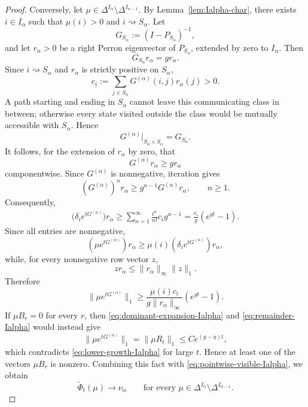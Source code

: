 \documentclass[10pt,letterpaper]{article}
\theoremstyle{compactplain}
\theoremstyle{compactdefinition}
\newcommand{\1}{\mathds{1}}
\begin{document}
\begin{proof}
Conversely, let
$\mu\in\Delta^{I_\alpha}\setminus\Delta^{I_{\alpha-1}}$. By
Lemma~\ref{lem:Ialpha-char}, there exists $i\in I_\alpha$ such that
$\mu(i)>0$ and $i\rightsquigarrow S_\alpha$. Let
\[
G_{S_\alpha}:=(I-P_{S_\alpha})^{-1},
\]
and let $r_\alpha>0$ be a right Perron eigenvector of $P_{S_\alpha}$,
extended by zero to $I_\alpha$. Then
\[
G_{S_\alpha}r_\alpha=gr_\alpha.
\]
Since $i\rightsquigarrow S_\alpha$ and $r_\alpha$ is strictly positive on
$S_\alpha$,
\[
c_i
:=
\sum_{j\in S_\alpha}G^{(\alpha)}(i,j)r_\alpha(j)
>0.
\]
A path starting and ending in $S_\alpha$ cannot leave this communicating
class in between; otherwise every state visited outside the class would be
mutually accessible with $S_\alpha$. Hence
\[
G^{(\alpha)}|_{S_\alpha\times S_\alpha}=G_{S_\alpha}.
\]
It follows, for the extension of $r_\alpha$ by zero, that
\[
G^{(\alpha)}r_\alpha\geq gr_\alpha
\]
componentwise. Since $G^{(\alpha)}$ is nonnegative, iteration gives
\[
(G^{(\alpha)})^nr_\alpha
\geq
g^{n-1}G^{(\alpha)}r_\alpha,
\qquad n\geq1.
\]
Consequently,
\[
\begin{aligned}
\bigl(\delta_i e^{tG^{(\alpha)}}\bigr)r_\alpha
\geq
\sum_{n=1}^{\infty}\frac{t^n}{n!}c_ig^{n-1}=
\frac{c_i}{g}(e^{gt}-1).
\end{aligned}
\]
Since all entries are nonnegative,
\[
(\mu e^{tG^{(\alpha)}})r_\alpha
\geq
\mu(i)(\delta_i e^{tG^{(\alpha)}})r_\alpha,
\]
while, for every nonnegative row vector $z$,
\[
zr_\alpha\leq\|r_\alpha\|_\infty\|z\|_1.
\]
Therefore
\begin{equation}
\label{eq:lower-growth-Ialpha}
\|\mu e^{tG^{(\alpha)}}\|_1
\geq
\frac{\mu(i)c_i}{g\|r_\alpha\|_\infty}(e^{gt}-1).
\end{equation}
If $\mu B_r=0$ for every $r$, then
\eqref{eq:dominant-expansion-Ialpha} and
\eqref{eq:remainder-Ialpha} would instead give
\[
\|\mu e^{tG^{(\alpha)}}\|_1
=
\|\mu R_t\|_1
\leq
Ce^{(g-\eta)t},
\]
which contradicts \eqref{eq:lower-growth-Ialpha} for large $t$. Hence at least
one of the vectors $\mu B_r$ is nonzero. Combining this fact with
\eqref{eq:pointwise-visible-Ialpha}, we obtain
\begin{equation}
\label{eq:pointwise-stratum-Ialpha}
\widetilde\Phi_t(\mu)\longrightarrow\nu_\alpha
\qquad
\text{for every }
\mu\in\Delta^{I_\alpha}\setminus\Delta^{I_{\alpha-1}}.
\end{equation}


\end{proof}
\end{document}
